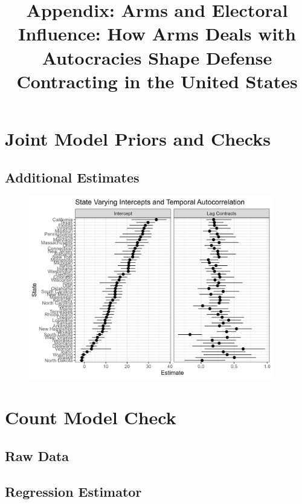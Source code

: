 \documentclass[12pt]{article}
\title{\textbf{Appendix: Arms and Electoral Influence: How Arms Deals with Autocracies Shape Defense Contracting in the United States}}
\date{}
\begin{document}
\maketitle 

\singlespace 

\tableofcontents

\bigskip


\section{Joint Model Priors and Checks} 


\subsection{Additional Estimates}


\begin{figure}[htpb]
	\centering
		\includegraphics[width=0.95\textwidth]{state-pars.png}
	\caption{}
	\label{fig:state-pars}
\end{figure}




\section{Count Model Check}

\subsection{Raw Data}


\subsection{Regression Estimator}
\end{document}
